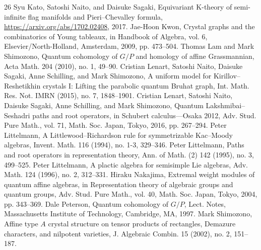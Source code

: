 \begin{thebibliography}{26}
 Syu Kato, Satoshi Naito, and Daisuke Sagaki, Equivariant K-theory of semi-infinite flag manifolds and Pieri--Chevalley formula, \url{https://arxiv.org/abs/1702.02408}, 2017.
 Jae-Hoon Kwon, Crystal graphs and the combinatorics of Young tableaux, in Handbook of Algebra, vol. 6, Elsevier/North-Holland, Amsterdam, 2009, pp. 473--504.
 Thomas Lam and Mark Shimozono, Quantum cohomology of $G/P$ and homology of affine Grassmannian, Acta Math. 204 (2010), no. 1, 49--90.
 Cristian Lenart, Satoshi Naito, Daisuke Sagaki, Anne Schilling, and Mark Shimozono, A uniform model for Kirillov--Reshetikhin crystals I: Lifting the parabolic quantum Bruhat graph, Int. Math. Res. Not. IMRN (2015), no. 7, 1848--1901.
 Cristian Lenart, Satoshi Naito, Daisuke Sagaki, Anne Schilling, and Mark Shimozono, Quantum Lakshmibai--Seshadri paths and root operators, in Schubert calculus---Osaka 2012, Adv. Stud. Pure Math., vol. 71, Math. Soc. Japan, Tokyo, 2016, pp. 267--294.
 Peter Littelmann, A Littlewood--Richardson rule for symmetrizable Kac--Moody algebras, Invent. Math. 116 (1994), no. 1-3, 329--346.
 Peter Littelmann, Paths and root operators in representation theory, Ann. of Math. (2) 142 (1995), no. 3, 499--525.
 Peter Littelmann, A plactic algebra for semisimple Lie algebras, Adv. Math. 124 (1996), no. 2, 312--331.
 Hiraku Nakajima, Extremal weight modules of quantum affine algebras, in Representation theory of algebraic groups and quantum groups, Adv. Stud. Pure Math., vol. 40, Math. Soc. Japan, Tokyo, 2004, pp. 343--369.
 Dale Peterson, Quantum cohomology of $G/P$, Lect. Notes, Massachusetts Institute of Technology, Cambridge, MA, 1997.
 Mark Shimozono, Affine type $A$ crystal structure on tensor products of rectangles, Demazure characters, and nilpotent varieties, J. Algebraic Combin. 15 (2002), no. 2, 151--187.
\end{thebibliography}
